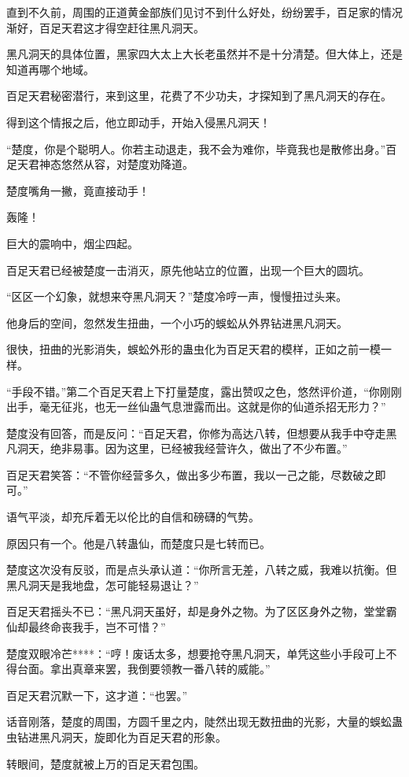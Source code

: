 \begin{this_body}
直到不久前，周围的正道黄金部族们见讨不到什么好处，纷纷罢手，百足家的情况渐好，百足天君这才得空赶往黑凡洞天。

黑凡洞天的具体位置，黑家四大太上大长老虽然并不是十分清楚。但大体上，还是知道再哪个地域。

百足天君秘密潜行，来到这里，花费了不少功夫，才探知到了黑凡洞天的存在。

得到这个情报之后，他立即动手，开始入侵黑凡洞天！

“楚度，你是个聪明人。你若主动退走，我不会为难你，毕竟我也是散修出身。”百足天君神态悠然从容，对楚度劝降道。

楚度嘴角一撇，竟直接动手！

轰隆！

巨大的震响中，烟尘四起。

百足天君已经被楚度一击消灭，原先他站立的位置，出现一个巨大的圆坑。

“区区一个幻象，就想来夺黑凡洞天？”楚度冷哼一声，慢慢扭过头来。

他身后的空间，忽然发生扭曲，一个小巧的蜈蚣从外界钻进黑凡洞天。

很快，扭曲的光影消失，蜈蚣外形的蛊虫化为百足天君的模样，正如之前一模一样。

“手段不错。”第二个百足天君上下打量楚度，露出赞叹之色，悠然评价道，“你刚刚出手，毫无征兆，也无一丝仙蛊气息泄露而出。这就是你的仙道杀招无形力？”

楚度没有回答，而是反问：“百足天君，你修为高达八转，但想要从我手中夺走黑凡洞天，绝非易事。因为这里，已经被我经营许久，做出了不少布置。”

百足天君笑答：“不管你经营多久，做出多少布置，我以一己之能，尽数破之即可。”

语气平淡，却充斥着无以伦比的自信和磅礴的气势。

原因只有一个。他是八转蛊仙，而楚度只是七转而已。

楚度这次没有反驳，而是点头承认道：“你所言无差，八转之威，我难以抗衡。但黑凡洞天是我地盘，怎可能轻易退让？”

百足天君摇头不已：“黑凡洞天虽好，却是身外之物。为了区区身外之物，堂堂霸仙却最终命丧我手，岂不可惜？”

楚度双眼冷芒****：“哼！废话太多，想要抢夺黑凡洞天，单凭这些小手段可上不得台面。拿出真章来罢，我倒要领教一番八转的威能。”

百足天君沉默一下，这才道：“也罢。”

话音刚落，楚度的周围，方圆千里之内，陡然出现无数扭曲的光影，大量的蜈蚣蛊虫钻进黑凡洞天，旋即化为百足天君的形象。

转眼间，楚度就被上万的百足天君包围。


\end{this_body}
